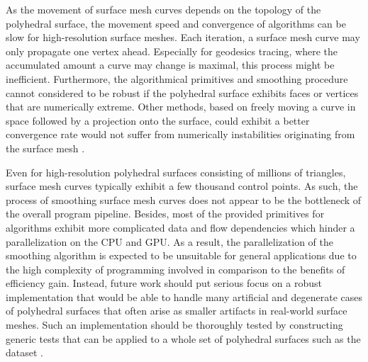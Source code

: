 \documentclass[crop=false]{stdlocal}
\begin{document}
  As the movement of surface mesh curves depends on the topology of the polyhedral surface, the movement speed and convergence of algorithms can be slow for high-resolution surface meshes.
  Each iteration, a surface mesh curve may only propagate one vertex ahead.
  Especially for geodesics tracing, where the accumulated amount a curve may change is maximal, this process might be inefficient.
  Furthermore, the algorithmical primitives and smoothing procedure cannot considered to be robust if the polyhedral surface exhibits faces or vertices that are numerically extreme.
  Other methods, based on freely moving a curve in space followed by a projection onto the surface, could exhibit a better convergence rate would not suffer from numerically instabilities originating from the surface mesh \autocite{crane2020}.

  Even for high-resolution polyhedral surfaces consisting of millions of triangles, surface mesh curves typically exhibit a few thousand control points.
  As such, the process of smoothing surface mesh curves does not appear to be the bottleneck of the overall program pipeline.
  Besides, most of the provided primitives for algorithms exhibit more complicated data and flow dependencies which hinder a parallelization on the CPU and GPU.
  As a result, the parallelization of the smoothing algorithm is expected to be unsuitable for general applications due to the high complexity of programming involved in comparison to the benefits of efficiency gain.
  Instead, future work should put serious focus on a robust implementation that would be able to handle many artificial and degenerate cases of polyhedral surfaces that often arise as smaller artifacts in real-world surface meshes.
  Such an implementation should be thoroughly tested by constructing generic tests that can be applied to a whole set of polyhedral surfaces such as the  dataset \autocite{thingi10k,mancinelli2022}.
\end{document}
